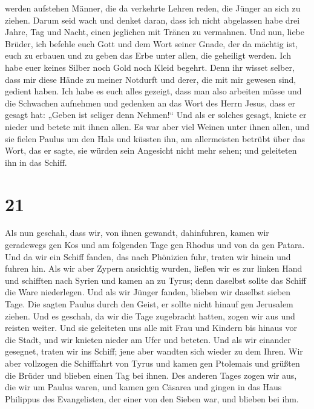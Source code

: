 werden aufstehen Männer, die da verkehrte Lehren reden, die Jünger an
sich zu ziehen.  Darum seid wach und denket daran, dass
ich nicht abgelassen habe drei Jahre, Tag und Nacht, einen jeglichen mit
Tränen zu vermahnen.  Und nun, liebe Brüder, ich befehle
euch Gott und dem Wort seiner Gnade, der da mächtig ist, euch zu erbauen
und zu geben das Erbe unter allen, die geheiligt werden. 
Ich habe euer keines Silber noch Gold noch Kleid begehrt.
 Denn ihr wisset selber, dass mir diese Hände zu meiner
Notdurft und derer, die mit mir gewesen sind, gedient haben.
 Ich habe es euch alles gezeigt, dass man also arbeiten
müsse und die Schwachen aufnehmen und gedenken an das Wort des Herrn
Jesus, dass er gesagt hat: „Geben ist seliger denn Nehmen!{}``
 Und als er solches gesagt, kniete er nieder und betete
mit ihnen allen.  Es war aber viel Weinen unter ihnen
allen, und sie fielen Paulus um den Hals und küssten ihn,
 am allermeisten betrübt über das Wort, das er sagte, sie
würden sein Angesicht nicht mehr sehen; und geleiteten ihn in das
Schiff.

\hypertarget{section-20}{%
\section{21}\label{section-20}}

 Als nun geschah, dass wir, von ihnen gewandt,
dahinfuhren, kamen wir geradewegs gen Kos und am folgenden Tage gen
Rhodus und von da gen Patara.  Und da wir ein Schiff
fanden, das nach Phönizien fuhr, traten wir hinein und fuhren hin.
 Als wir aber Zypern ansichtig wurden, ließen wir es zur
linken Hand und schifften nach Syrien und kamen an zu Tyrus; denn
daselbst sollte das Schiff die Ware niederlegen.  Und als
wir Jünger fanden, blieben wir daselbst sieben Tage. Die sagten Paulus
durch den Geist, er sollte nicht hinauf gen Jerusalem ziehen.
 Und es geschah, da wir die Tage zugebracht hatten, zogen
wir aus und reisten weiter. Und sie geleiteten uns alle mit Frau und
Kindern bis hinaus vor die Stadt, und wir knieten nieder am Ufer und
beteten.  Und als wir einander gesegnet, traten wir ins
Schiff; jene aber wandten sich wieder zu dem Ihren.  Wir
aber vollzogen die Schifffahrt von Tyrus und kamen gen Ptolemais und
grüßten die Brüder und blieben einen Tag bei ihnen.  Des
anderen Tages zogen wir aus, die wir um Paulus waren, und kamen gen
Cäsarea und gingen in das Haus Philippus des Evangelisten, der einer von
den Sieben war, und blieben bei ihm.


